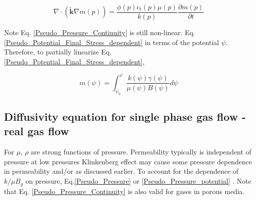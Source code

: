 \documentclass{llncs}
\numberwithin{equation}{section}
\numberwithin{figure}{section}
\numberwithin{table}{section}
\begin{document}
    \begin{equation}
        \nabla \cdot \left( \widetilde{\mathbf{k}}\nabla m\left( p \right) \right)=\frac{\phi \left( p \right){{c}_{t}}\left( p \right)\mu \left( p \right)}{k\left( p \right)}\frac{\partial m\left( p \right)}{\partial t}
    \label{Pseudo_Pressure_Continuity}
    \end{equation}

    Note Eq. \ref{Pseudo_Pressure_Continuity} is still non-linear.  Eq. \ref{Pseudo_Potential_Final_Stress_dependent}  in terms of the potential $\psi$. Therefore, to partially linearize Eq. \ref{Pseudo_Potential_Final_Stress_dependent}, 

    \begin{equation}
        m\left( \psi  \right)=\int_{{{\psi }_{0}}}^{\psi }{\frac{k\left( \psi  \right)\gamma \left( \psi  \right)}{\mu \left( \psi  \right)B\left( \psi  \right)}d\psi }
    \label{Pseudo_Pressure_potential}
    \end{equation}

    \subsection{Diffusivity equation for single phase gas flow - real gas flow}
    For  $\mu$, $\rho$ are strong functions of pressure. Permeability typically is independent of pressure at low pressures Klinkenberg effect may cause some pressure dependence in permeability and/or  as discussed earlier. To account for the dependence of $k/ \mu B_{g}$ on pressure, Eq.\ref{Pseudo_Pressure} or \ref{Pseudo_Pressure_potential} . Note that Eq. \ref{Pseudo_Pressure_Continuity} is also valid for  gases in porous media.\\
\end{document}
